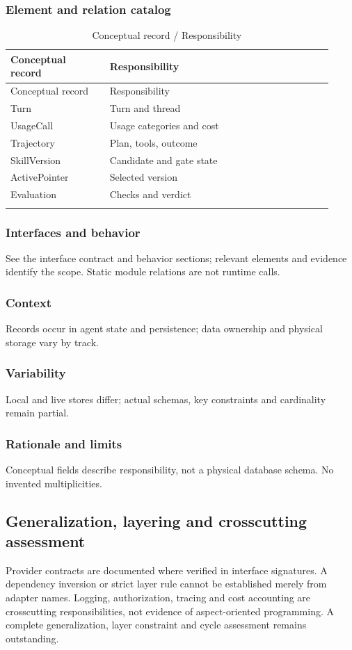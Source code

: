 \documentclass[10pt,letterpaper]{article}
\begin{document}
\subsubsection{Element and relation catalog}
\begin{longtable}{@{}>{\raggedright\arraybackslash}p{0.29\linewidth}>{\raggedright\arraybackslash}p{0.63\linewidth}@{}}
\caption{Conceptual record / Responsibility}\\
\toprule Conceptual record & Responsibility\\\midrule\endfirsthead
\toprule Conceptual record & Responsibility\\\midrule\endhead
Turn & Turn and thread\\\addlinespace
UsageCall & Usage categories and cost\\\addlinespace
Trajectory & Plan, tools, outcome\\\addlinespace
SkillVersion & Candidate and gate state\\\addlinespace
ActivePointer & Selected version\\\addlinespace
Evaluation & Checks and verdict\\\addlinespace
\bottomrule\end{longtable}

\subsubsection{Interfaces and behavior}
See the interface contract and behavior sections; relevant elements and evidence identify the scope. Static module relations are not runtime calls.
\subsubsection{Context}
Records occur in agent state and persistence; data ownership and physical storage vary by track.
\subsubsection{Variability}
Local and live stores differ; actual schemas, key constraints and cardinality remain partial.
\subsubsection{Rationale and limits}
Conceptual fields describe responsibility, not a physical database schema. No invented multiplicities.

\subsection{Generalization, layering and crosscutting assessment}
Provider contracts are documented where verified in interface signatures. A dependency inversion or strict layer rule cannot be established merely from adapter names. Logging, authorization, tracing and cost accounting are crosscutting responsibilities, not evidence of aspect-oriented programming. A complete generalization, layer constraint and cycle assessment remains outstanding.
\end{document}
